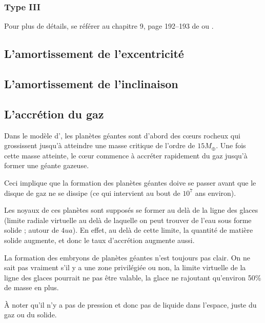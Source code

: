\subsubsection{Type III}


\begin{remarque}
Pour plus de détails, se référer au chapitre 9, page 192--193 de \cite{barnes2010formation} ou \cite{masset2003runaway}.
\end{remarque}

\subsection{L'amortissement de l'excentricité}%

\subsection{L'amortissement de l'inclinaison}%

\subsection{L'accrétion du gaz}\label{sec:accretion_coeur}
Dans le modèle d', les planètes géantes sont d'abord des c\oe urs rocheux qui grossissent jusqu'à atteindre une masse critique de l'ordre de $15 M_{\oplus}$. Une fois cette masse atteinte, le c\oe ur commence à accréter rapidement du gaz jusqu'à former une géante gazeuse.

Ceci implique que la formation des planètes géantes doive se passer avant que le disque de gaz ne se dissipe (ce qui intervient au bout de $10^7$ ans environ).

Les noyaux de ces planètes sont supposés se former au delà de la ligne des glaces (limite radiale virtuelle au delà de laquelle on peut trouver de l'eau sous forme solide ; autour de $4\unit{ua}$). En effet, au delà de cette limite, la quantité de matière solide augmente, et donc le taux d'accrétion augmente aussi.

\begin{attention}
La formation des embryons de planètes géantes n'est toujours pas clair. On ne sait pas vraiment s'il y a une zone privilégiée ou non, la limite virtuelle de la ligne des glaces pourrait ne pas être valable, la glace ne rajoutant qu'environ 50\% de masse en plus.

À noter qu'il n'y a pas de pression et donc pas de liquide dans l'espace, juste du gaz ou du solide.
\end{attention}

